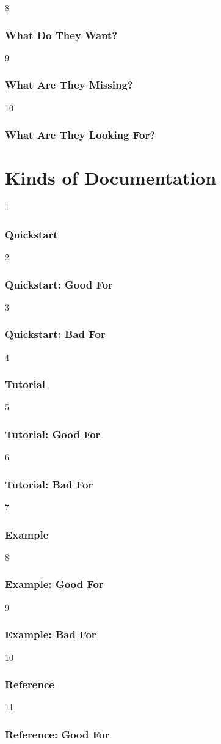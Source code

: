 8
\begin{frame}
\frametitle{What Do They Want?}
\end{frame}

9
\begin{frame}
\frametitle{What Are They Missing?}
\end{frame}

10
\begin{frame}
\frametitle{What Are They Looking For?}
\end{frame}

\section{Kinds of Documentation}

1
\begin{frame}
\frametitle{Quickstart}
\end{frame}

2
\begin{frame}
\frametitle{Quickstart: Good For}
\end{frame}

3
\begin{frame}
\frametitle{Quickstart: Bad For}
\end{frame}

4
\begin{frame}
\frametitle{Tutorial}
\end{frame}

5
\begin{frame}
\frametitle{Tutorial: Good For}
\end{frame}

6
\begin{frame}
\frametitle{Tutorial: Bad For}
\end{frame}

7
\begin{frame}
\frametitle{Example}
\end{frame}

8
\begin{frame}
\frametitle{Example: Good For}
\end{frame}

9
\begin{frame}
\frametitle{Example: Bad For}
\end{frame}

10
\begin{frame}
\frametitle{Reference}
\end{frame}

11
\begin{frame}
\frametitle{Reference: Good For}
\end{frame}

